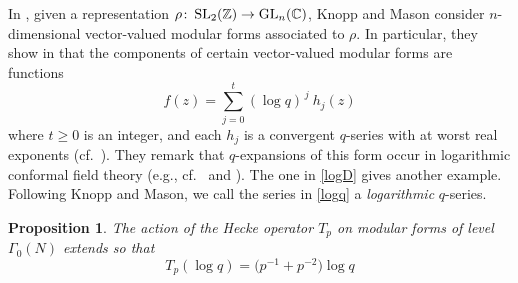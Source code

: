 \documentclass{gtpart}
\newtheorem{prop}[equation]{Proposition}
\theoremstyle{definition}
\theoremstyle{remark}
\def\co{\colon\thinspace}
\newcommand{\mb}[1]{\mathbb{#1}}
\newcommand{\BC}{{\mb C}}
\newcommand{\BZ}{{\mb Z}}
\newcommand{\G}{\Gamma}
\renewcommand{\=}{\approx}
\renewcommand{\-}{\sim}
\newcommand{\GL}{{\rm GL}}
\newcommand{\SL}{{\rm SL}}
\numberwithin{equation}{section}
\begin{document}
In \cite{KnoppMason}, given a representation 
$\rho \co \SL_2(\BZ) \to \GL_n(\BC)$, Knopp and Mason consider $n$-dimensional 
vector-valued modular forms associated to $\rho$.  In particular, they show in 
\cite[Theorem 2.2]{KnoppMason} that the components of certain vector-valued 
modular forms are functions 
\begin{equation}
 \label{logq}
 f(z) = \sum_{j = 0}^t (\log q)^{\,j} ~\! h_j(z) 
\end{equation}
where $t \geq 0$ is an integer, and each $h_j$ is a convergent $q$-series with 
at worst real exponents 
(cf.~\cite[(7), (13), and Sections 3.2--3.3]{KnoppMason}).  They remark that 
$q$-expansions of this form occur in logarithmic conformal field theory (e.g., 
cf.~\cite[(5.3.9)]{Zhu} and \cite[(6.12)]{DongLiMason}).  The one in 
\eqref{logD} gives another example.  Following Knopp and Mason, we call the 
series in \eqref{logq} a {\em logarithmic} $q$-series.  

\begin{prop}
 \label{prop:logq}
 The action of the Hecke operator $T_p$ on modular forms of level $\G_0(N)$ 
 extends so that 
 \[
  T_p (\log q) = \big( p^{-1} + p^{-2} \big) \log q 
 \]
\end{prop}
\end{document}
